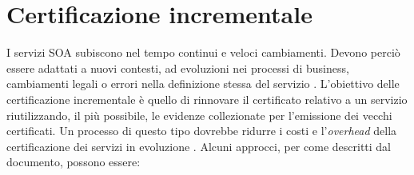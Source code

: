 \documentclass[../main.tex]{subfiles}
\begin{document}
\section{Certificazione incrementale} %
I servizi SOA subiscono nel tempo continui e veloci cambiamenti. Devono perciò essere adattati a nuovi contesti, ad evoluzioni nei processi di business, cambiamenti legali o errori nella definizione stessa del servizio \cite{Casati}.
L'obiettivo delle certificazione incrementale è quello di rinnovare il certificato relativo a un servizio riutilizzando, il più possibile, le evidenze collezionate per l'emissione dei vecchi certificati.
Un processo di questo tipo dovrebbe ridurre i costi e l'\textit{overhead} della certificazione dei servizi in evoluzione \cite{CertEvolutiva}.
Alcuni approcci, per come descritti dal documento, possono essere:
\end{document}
